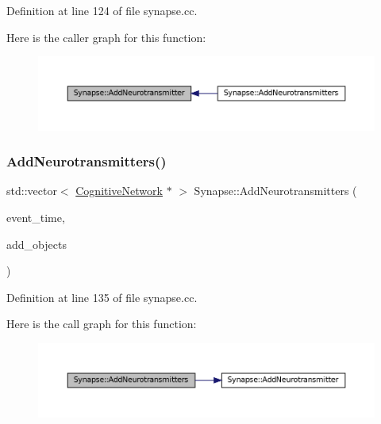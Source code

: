 Definition at line 124 of file synapse.\+cc.

Here is the caller graph for this function\+:\nopagebreak
\begin{figure}[H]
\begin{center}
\leavevmode
\includegraphics[width=350pt]{class_synapse_a76b96e3f71f9e7b0ba6b80166c3883f7_icgraph}
\end{center}
\end{figure}
\mbox{\label{class_synapse_a5ad01cc92c00d790b44472156065786e}} 
\subsubsection{\texorpdfstring{Add\+Neurotransmitters()}{AddNeurotransmitters()}}
{\footnotesize\ttfamily std\+::vector$<$ \mbox{\hyperlink{class_cognitive_network}{Cognitive\+Network}} $\ast$ $>$ Synapse\+::\+Add\+Neurotransmitters (\begin{DoxyParamCaption}\item[{std\+::chrono\+::time\+\_\+point$<$ \mbox{\hyperlink{universe_8h_a0ef8d951d1ca5ab3cfaf7ab4c7a6fd80}{Clock}} $>$}]{event\+\_\+time,  }\item[{std\+::vector$<$ \mbox{\hyperlink{class_cognitive_network}{Cognitive\+Network}} $\ast$$>$}]{add\+\_\+objects }\end{DoxyParamCaption})}



Definition at line 135 of file synapse.\+cc.

Here is the call graph for this function\+:\nopagebreak
\begin{figure}[H]
\begin{center}
\leavevmode
\includegraphics[width=350pt]{class_synapse_a5ad01cc92c00d790b44472156065786e_cgraph}
\end{center}
\end{figure}
\mbox{\label{class_synapse_a1b52aa12cc7c28bfa2564e21ac17eb07}} 
